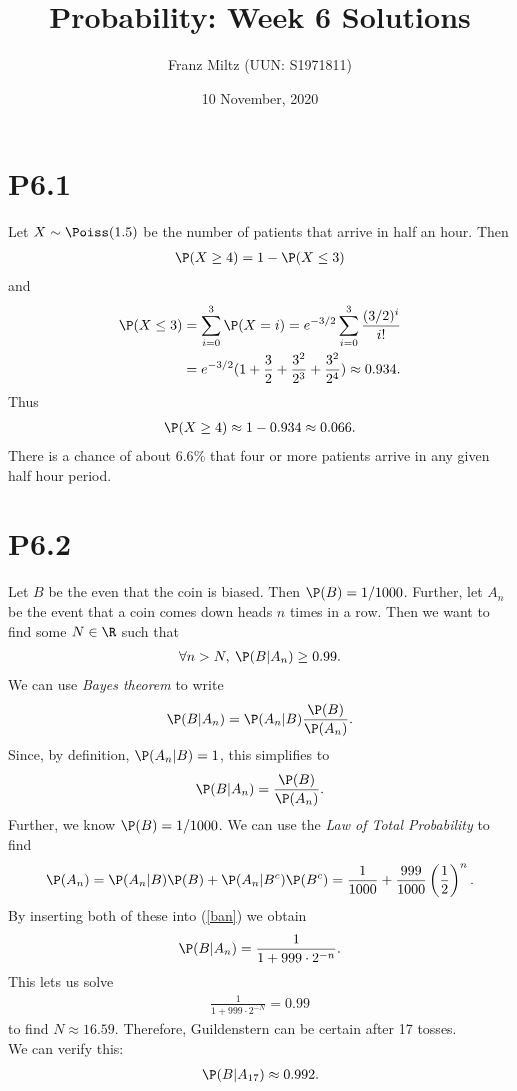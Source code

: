 \documentclass{article}
\begin{document}
\title{Probability: Week 6 Solutions}
\author{Franz Miltz (UUN: S1971811)}
\date{10 November, 2020}
\maketitle


\section*{P6.1}


Let $X\sim\Poiss(1.5)$ be the number of patients that arrive in half an hour. Then
\begin{align*}
	\P(X \geq 4) = 1 - \P(X \leq 3)
\end{align*}
and
\begin{align*}
	\P(X \leq 3) & = \sum_{i=0}^3 \P(X=i)=e^{-3/2}\sum_{i=0}^3 \frac{(3/2)^i}{i!} \\
	             & =e^{-3/2} (1+\frac{3}{2}+\frac{3^2}{2^3}+\frac{3^2}{2^4})
	\approx 0.934.
\end{align*}
Thus
\begin{align*}
	\P(X\geq 4) \approx 1 - 0.934 \approx 0.066.
\end{align*}
There is a chance of about $6.6\%$ that four or more patients arrive in
any given half hour period.


\section*{P6.2}


Let $B$ be the even that the coin is biased. Then $\P(B)=1/1000$. Further,
let $A_n$ be the event that a coin comes down heads $n$ times in a row.
Then we want to find some $N\in\R$ such that
\begin{align*}
	\forall n > N,\: \P(B|A_n)\geq 0.99.
\end{align*}
We can use \emph{Bayes theorem} to write
\begin{align*}
	\P(B|A_n) = \P(A_n|B)\frac{\P(B)}{\P(A_n)}.
\end{align*}
Since, by definition, $\P(A_n|B)=1$, this simplifies to
\begin{align}
	\label{ban}
	\P(B|A_n) = \frac{\P(B)}{\P(A_n)}.
\end{align}
Further, we know $\P(B)=1/1000$. We can use the \emph{Law of Total
	Probability} to find
\begin{align*}
	\P(A_n)=\P(A_n|B)\P(B) + \P(A_n|B^c)\P(B^c)
	=\frac{1}{1000}+\frac{999}{1000}\left(\frac{1}{2}\right)^n.
\end{align*}
By inserting both of these into (\ref{ban}) we obtain
\begin{align*}
	\P(B|A_n) = \frac{1}{1+999\cdot 2^{-n}}.
\end{align*}
This lets us solve
\begin{align*}
	\frac{1}{1+999\cdot 2^{-N}} = 0.99
\end{align*}
to find $N\approx 16.59$. Therefore, Guildenstern can be certain after
17 tosses.\\
We can verify this:
\begin{align*}
	\P(B|A_{17}) \approx 0.992.
\end{align*}
\end{document}
